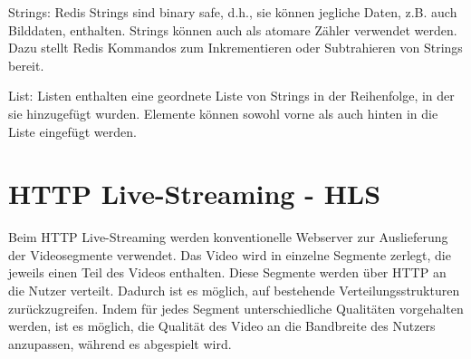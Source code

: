 Strings:
Redis Strings sind binary safe, d.h., sie können jegliche Daten, z.B. auch Bilddaten, enthalten. Strings können auch als atomare Zähler verwendet werden. Dazu stellt Redis Kommandos zum Inkrementieren oder Subtrahieren von Strings bereit.

List:
Listen enthalten eine geordnete Liste von Strings in der Reihenfolge, in der sie hinzugefügt wurden. Elemente können sowohl vorne als auch hinten in die Liste eingefügt werden.

\section{HTTP Live-Streaming - HLS}
Beim HTTP Live-Streaming\cite{hls-sdt} werden konventionelle Webserver zur Auslieferung der Videosegmente verwendet. Das Video wird in einzelne Segmente zerlegt, die jeweils einen Teil des Videos enthalten. Diese Segmente werden über HTTP an die Nutzer verteilt. Dadurch ist es möglich, auf bestehende Verteilungsstrukturen zurückzugreifen. Indem für jedes Segment unterschiedliche Qualitäten vorgehalten werden, ist es möglich, die Qualität des Video an die Bandbreite des Nutzers anzupassen, während es abgespielt wird.
